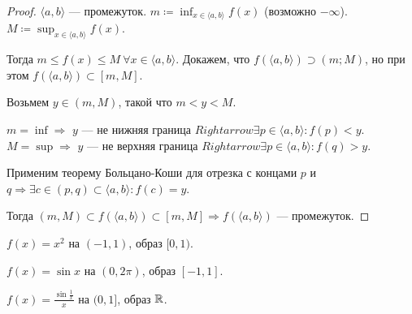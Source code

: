 \begin{proof}
    $\langle a, b \rangle$ --- промежуток.  $m \coloneqq \inf_{x \in \langle a, b \rangle} f(x)$ (возможно $-\infty$). $M \coloneqq \sup_{x \in \langle a, b \rangle} f(x)$.

    Тогда  $m \le f(x) \le M\ \forall x \in \langle a, b \rangle$. Докажем, что $f(\langle a, b \rangle) \supset (m; M)$, но при этом  $f(\langle a, b \rangle) \subset [m, M]$. 

    Возьмем  $y \in (m, M)$, такой что  $m < y < M$.  

    $m = \inf \Rightarrow$ $y$ ---  не нижняя граница $Rightarrow \exists p \in \langle a, b \rangle\!: f(p) < y$. 
    $M = \sup \Rightarrow$ $y$ ---  не верхняя граница $Rightarrow \exists p \in \langle a, b \rangle\!: f(q) > y$.

    Применим теорему Больцано-Коши для отрезка с концами $p$ и  $q \Rightarrow \exists c \in (p, q) \subset \langle a, b \rangle\!: f(c)=y$. 

    Тогда $(m, M) \subset f(\langle a, b \rangle) \subset [m, M] \Rightarrow f(\langle a, b \rangle)$ --- промежуток. 
\end{proof}
\begin{remark}
    $f(x) = x^2$ на  $(-1, 1)$, образ  $[0, 1)$.

    $f(x) = \sin x$ на  $(0, 2\pi)$, образ $[-1, 1]$.

    $f(x) = \frac{\sin \frac{1}{x}}{x}$ на $(0, 1]$, образ  $\mathbb{R}$.
\end{remark}

